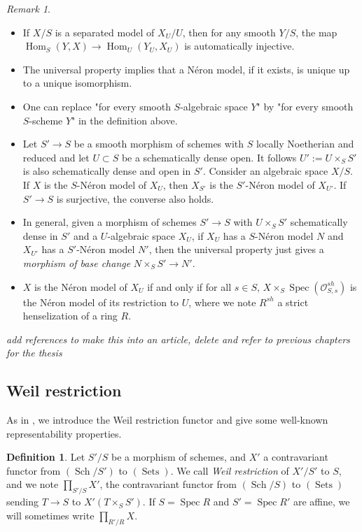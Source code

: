 \documentclass{article}
\renewcommand{\O}{\mathcal{O}}
\DeclareMathOperator{\spec}{Spec}
\DeclareMathOperator{\sch}{Sch}
\DeclareMathOperator{\sets}{Sets}
\DeclareMathOperator{\Hom}{Hom}
\theoremstyle{definition}
\newtheorem{defi}[thm]{Definition}
\theoremstyle{remark}
\newtheorem{rem}{Remark}[thm]
\begin{document}
\begin{rem}\label{remarque proprietes des NM}
\begin{itemize}
\item If $X/S$ is a separated model of $X_U/U$, then  for any smooth $Y/S$, the map $\Hom_S(Y,X)\longrightarrow\Hom_U(Y_U,X_U)$ is automatically injective.
\item The universal property implies that a N\'eron model, if it exists, is unique up to a unique isomorphism.
\item One can replace "for every smooth $S$-algebraic space $Y$" by "for every smooth $S$-scheme $Y$" in the definition above.
\item Let $S'\longrightarrow S$ be a smooth morphism of schemes with $S$ locally Noetherian and reduced and let $U\subset S$ be a schematically dense open. It follows $U':=U\times_S S'$ is also schematically dense and open in $S'$. Consider an algebraic space $X/S$. If $X$ is the $S$-N\'eron model of $X_U$, then $X_{S'}$ is the $S'$-N\'eron model of $X_{U'}$. If $S'\longrightarrow S$ is surjective, the converse also holds.
\item In general, given a morphism of schemes $S'\longrightarrow S$ with $U\times_S S'$ schematically dense in $S'$ and a $U$-algebraic space $X_U$, if $X_U$ has a $S$-N\'eron model $N$ and $X_{U'}$ has a $S'$-N\'eron model $N'$, then the universal property just gives a \emph{morphism of base change} $N\times_S S'\longrightarrow N'$.
\item $X$ is the N\'eron model of $X_U$ if and only if for all $s\in S$, $X\times_S\spec(\O_{S,s}^{sh})$ is the N\'eron model of its restriction to $U$, where we note $R^{sh}$ a strict henselization of a ring $R$.
\end{itemize}
\end{rem}

\cite{aaa} \emph{add references to make this into an article, delete and refer to previous chapters for the thesis}



	\subsection{Weil restriction}
	
	As in \cite{TameRamification}, we introduce the Weil restriction functor and give some well-known representability properties.
	
\begin{defi}
Let $S'/S$ be a morphism of schemes, and $X'$ a contravariant functor from $(\sch/S')$ to $(\sets)$. We call \emph{Weil restriction} of $X'/S'$ to $S$, and we note $\prod\limits_{S'/S}X'$, the contravariant functor from $(\sch/S)$ to $(\sets)$ sending $T\longrightarrow S$ to $X'(T\times_S S')$. If $S=\spec R$ and $S'=\spec R'$ are affine, we will sometimes write $\prod\limits_{R'/R} X$.
\end{defi}
\end{document}
